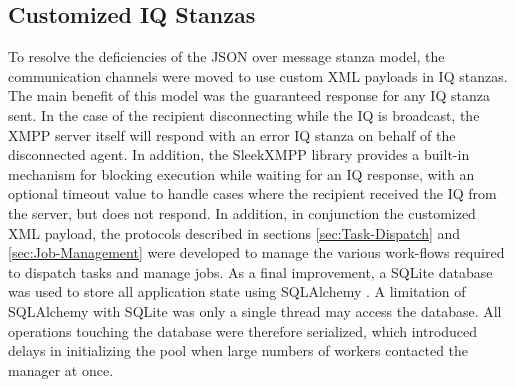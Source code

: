 \subsection{Customized IQ Stanzas}
\label{sec:Custom-IQ}
To resolve the deficiencies of the JSON over message stanza model, the
communication channels were moved to use custom XML payloads in IQ stanzas.
The main benefit of this model was the guaranteed response for any IQ stanza
sent. In the case of the recipient disconnecting while the IQ is broadcast,
the XMPP server itself will respond with an error IQ stanza on behalf of the
disconnected agent. In addition, the SleekXMPP library provides a built-in
mechanism for blocking execution while waiting for an IQ response, with an
optional timeout value to handle cases where the recipient received the IQ from
the server, but does not respond. In addition, in conjunction the customized
XML payload, the protocols described in sections \ref{sec:Task-Dispatch} and
\ref{sec:Job-Management} were developed to manage the various work-flows
required to dispatch tasks and manage jobs. As a final improvement, a SQLite
\cite{SQLite} database was used to store all application state using SQLAlchemy
\cite{SQLAlchemy}. A limitation of SQLAlchemy with SQLite was only a single
thread may access the database. All operations touching the database were
therefore serialized, which introduced delays in initializing the pool when
large numbers of workers contacted the manager at once.
